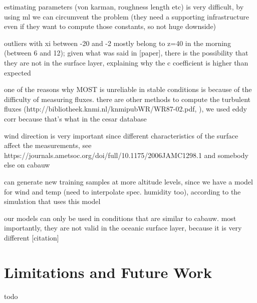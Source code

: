 \documentclass[12pt]{book}
\begin{document}
estimating parameters (von karman, roughness length etc) is very difficult, by using ml we can circumvent the problem (they need a supporting infrastructure even if they want to compute those constants, so not huge downside)

outliers with xi between -20 and -2 mostly belong to z=40 in the morning (between 6 and 12); given what was said in [paper], there is the possibility that they are not in the surface layer, explaining why the c coefficient is higher than expected

one of the reasons why MOST is unreliable in stable conditions is because of the difficulty of measuring fluxes. there are other methods to compute the turbulent fluxes (http://bibliotheek.knmi.nl/knmipubWR/WR87-02.pdf, ), we used eddy corr because that's what in the cesar database

wind direction is very important since different characteristics of the surface affect the measurements, see https://journals.ametsoc.org/doi/full/10.1175/2006JAMC1298.1 and somebody else on cabauw

can generate new training samples at more altitude levels, since we have a model for wind and temp (need to interpolate spec. humidity too), according to the simulation that uses this model

our models can only be used in conditions that are similar to cabauw. most importantly, they are not valid in the oceanic surface layer, because it is very different [citation]

\section{Limitations and Future Work}
todo


%
%


\end{document}
